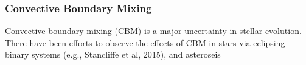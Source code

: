 {\color{purple}
\subsubsection{Convective Boundary Mixing}
}

Convective boundary mixing (CBM) is a major uncertainty in stellar evolution. There have been efforts to observe the effects of CBM in stars via eclipsing binary systems (e.g., Stancliffe et al, 2015), and asteroseis

